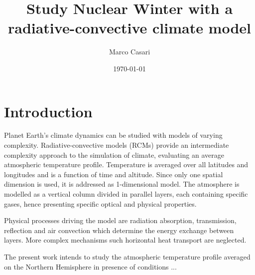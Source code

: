 \documentclass[a4paper,10pt,twocolumn,\classoptions]{article}
\begin{document}
\title{Study Nuclear Winter with a radiative-convective climate model} %
\author{Marco Casari}
\date{\today}
\maketitle

\begin{abstract}
\end{abstract}


\section{Introduction}
Planet Earth's climate dynamics can be studied with models of varying complexity. Radiative-convective models (RCMs) provide an intermediate complexity approach to the simulation of climate, evaluating an average atmospheric temperature profile. Temperature is averaged over all latitudes and longitudes and is a function of time and altitude. Since only one spatial dimension is used, it is addressed as 1-dimensional model. The atmosphere is modelled as a vertical column divided in parallel layers, each containing specific gases, hence presenting specific optical and physical properties.

Physical processes driving the model are radiation absorption, transmission, reflection and air convection which determine the energy exchange between layers. More complex mechanisms such horizontal heat transport are neglected.

The present work intends to study the atmospheric temperature profile averaged on the Northern Hemisphere in presence of conditions ...



\end{document}
